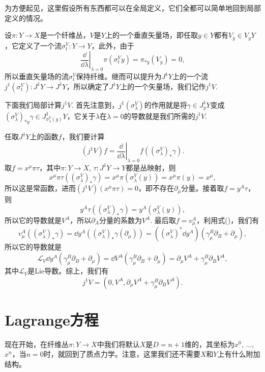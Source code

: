 \begin{para}[垂直矢量场的提升]
    为方便起见，这里假设所有东西都可以在全局定义，它们全都可以简单地回到局部定义的情况。

    设$\pi:Y\to X$是一个纤维丛，$V$是$Y$上的一个垂直矢量场，即任取$y\in Y$都有$V_y\in V_yY$，它定义了一个流$\sigma^V_t:Y\to Y$，此外，由于
    \[
        \left.\frac{\dd}{\dd \lambda}\right|_{\lambda=0}\pi(\sigma^V_ty)=\pi_{*y}(V_y)=0,
    \]
    所以垂直矢量场的流$\sigma^V_t$保持纤维。继而可以提升为$J^1Y$上的一个流$j^1(\sigma^V_t):J^1Y\to J^1Y$，所以确定了$J^1Y$上的一个矢量场，我们记作$j^1V$.

    下面我们局部计算$j^1V$. 首先注意到，$j^1(\sigma^V_\lambda)$的作用就是将$\gamma\in J^1_yY$变成$(\sigma^V_\lambda)_{*y}\gamma\in J^1_{\sigma^V_\lambda(y)}Y$，它关于$\lambda$在$\lambda=0$的导数就是我们所需的$j^1V$.

    任取$J^1Y$上的函数$f$，我们要计算
    \[
        (j^1V)f=\left.\frac{\dd}{\dd \lambda}\right|_{\lambda=0}f\left((\sigma^V_\lambda)_{*}\gamma\right).
    \]
    取$f=x^\mu\pi\tau$，其中$\pi:Y\to X$, $\tau:J^1Y\to Y$都是丛映射，则
    \[
        x^\mu\pi\tau\left((\sigma^V_\lambda)_{*}\gamma\right)=x^\mu\pi\left(\sigma^V_\lambda(y)\right)=x^\mu\pi(y)=x^\mu,
    \]
    所以这是常函数，进而$(j^1V)(x^\mu\pi\tau)=0$，即不存在$\partial_{\mu}$分量。接着取$f=y^A\tau$，则
    \[
        y^A\tau\left((\sigma^V_\lambda)_{*}\gamma\right)=y^A\left(\sigma^V_\lambda(y)\right),
    \]
    所以它的导数就是$V^A$，所以$\partial_A$分量的系数为$V^A$. 最后取$f=v^A_\mu$，利用式(\theequation)，我们有
    \[
        v^A_\mu((\sigma^V_\lambda)_{*}\gamma)=\dd y^A((\sigma^V_\lambda)_{*}\gamma(\partial_\mu))=\left ((\sigma^V_\lambda)^{*}\dd y^A\right )(\gamma_\mu^B\partial_B+\partial_\mu),
    \]
    所以它的导数就是
    \[
        \mathscr L_V\dd y^A(\gamma_\mu^B\partial_B+\partial_\mu)=\dd V^A(\gamma_\mu^B\partial_B+\partial_\mu)=\partial_\mu V^A+\gamma^B_\mu \partial_B V^A,
    \]
    其中$\mathscr L_V$是Lie导数。综上，我们有
    \[
        j^1V=\left(0,V^A,\partial_\mu V^A+\gamma^B_\mu \partial_B V^A\right).
    \]
\end{para}

\section{Lagrange方程}

现在开始，在纤维丛$\pi:Y\to X$中我们将默认$X$是$D=n+1$维的，其坐标为$x^0$, $\dots$, $x^n$，当$n=0$时，就回到了质点力学。注意，这里我们还不需要$X$和$Y$上有什么附加结构。

